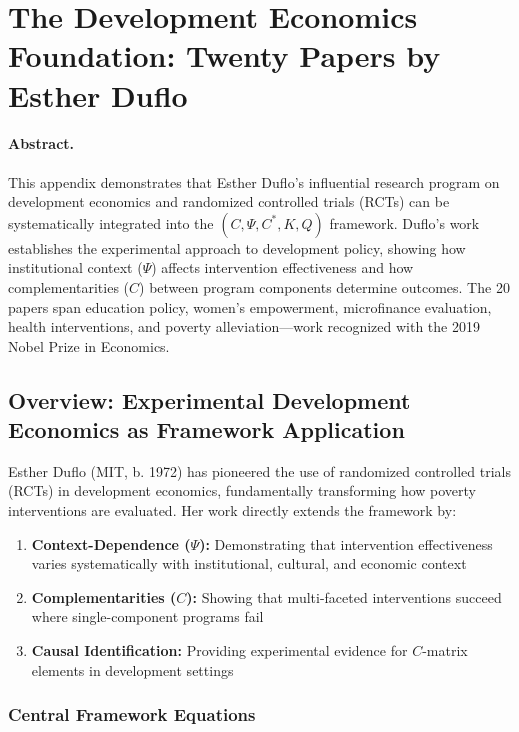 \section{The Development Economics Foundation: Twenty Papers by Esther Duflo}
\label{app:duflo}

\paragraph{Abstract.}
This appendix demonstrates that Esther Duflo's influential research program on
development economics and randomized controlled trials (RCTs) can be systematically 
integrated into the $(C, \Psi, C^*, K, Q)$ framework. Duflo's work establishes
the experimental approach to development policy, showing how institutional context 
($\Psi$) affects intervention effectiveness and how complementarities ($C$) between
program components determine outcomes. The 20 papers span education policy,
women's empowerment, microfinance evaluation, health interventions, and poverty
alleviation---work recognized with the 2019 Nobel Prize in Economics.

\subsection{Overview: Experimental Development Economics as Framework Application}

Esther Duflo (MIT, b. 1972) has pioneered the use of randomized controlled trials (RCTs)
in development economics, fundamentally transforming how poverty interventions are
evaluated. Her work directly extends the framework by:
\begin{enumerate}
  \item \textbf{Context-Dependence ($\Psi$):} Demonstrating that intervention effectiveness varies
        systematically with institutional, cultural, and economic context
  \item \textbf{Complementarities ($C$):} Showing that multi-faceted interventions succeed where
        single-component programs fail
  \item \textbf{Causal Identification:} Providing experimental evidence for $C$-matrix elements in
        development settings
\end{enumerate}

\subsubsection{Central Framework Equations}

